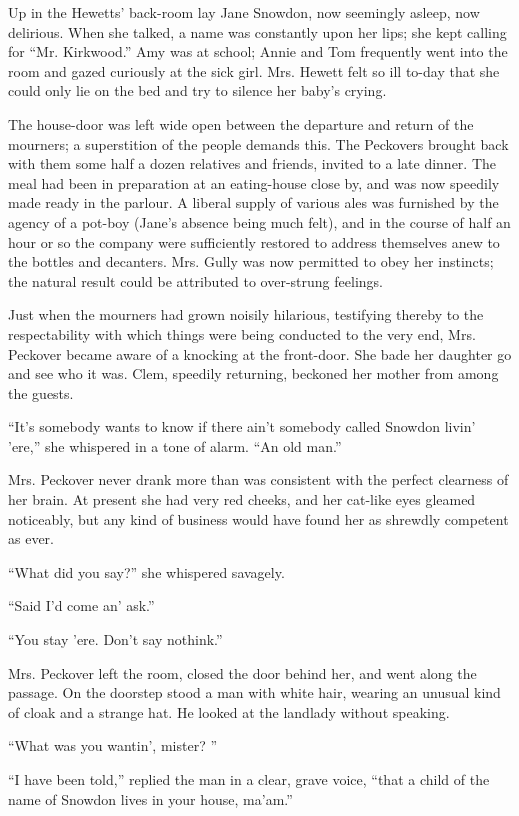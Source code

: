 Up in the Hewetts' back-room lay Jane Snowdon, now seemingly asleep, now
delirious. When she talked, a name was constantly upon her lips; she
kept calling for ``Mr. Kirkwood.'' Amy was at school; Annie and Tom
frequently went into the room and gazed curiously at the sick girl. Mrs.
Hewett felt so ill to-day that she could only lie on the bed and try to
silence her baby's crying.

The house-door was left wide open between the departure and return of
the mourners; a superstition of the people demands this. The Peckovers
brought back with them some half a dozen relatives and friends, invited
to a late dinner. The meal had been in preparation at an eating-house
close by, and was now speedily made ready in the parlour. A liberal
supply of various ales was furnished by the agency of a pot-boy (Jane's
absence being {}much felt), and in the course of half an hour or so the
company were sufficiently restored to address themselves anew to the
bottles and decanters. Mrs. Gully was now permitted to obey her
instincts; the natural result could be attributed to over-strung
feelings.

Just when the mourners had grown noisily hilarious, testifying thereby
to the respectability with which things were being conducted to the very
end, Mrs. Peckover became aware of a knocking at the front-door. She
bade her daughter go and see who it was. Clem, speedily returning,
beckoned her mother from among the guests.

``It's somebody wants to know if there ain't somebody called Snowdon
livin' 'ere,'' she whispered in a tone of alarm. ``An old man.''

Mrs. Peckover never drank more than was consistent with the perfect
clearness of her brain. At present she had very red cheeks, and her
cat-like eyes gleamed noticeably, but any kind of business would have
found her as shrewdly competent as ever.

{}``What did you say?'' she whispered savagely.

``Said I'd come an' ask.''

``You stay 'ere. Don't say nothink.''

Mrs. Peckover left the room, closed the door behind her, and went along
the passage. On the doorstep stood a man with white hair, wearing an
unusual kind of cloak and a strange hat. He looked at the landlady
without speaking.

``What was you wantin', mister? ''

``I have been told,'' replied the man in a clear, grave voice, ``that a
child of the name of Snowdon lives in your house, ma'am.''

